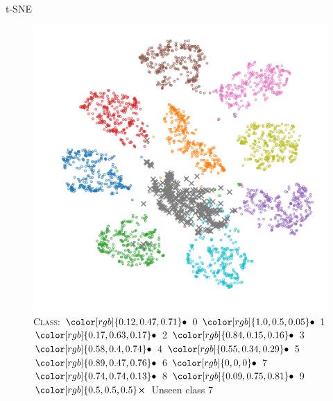 \documentclass[xcolor={usenames,dvipsnames}]{beamer}
\newcommand{\legendBulletMNIST}{\footnotesize
		\centering
		\textsc{Class}:
		${\color[rgb]{0.12, 0.47, 0.71}\bullet}$ 0
		${\color[rgb]{1.0, 0.5, 0.05}\bullet}$ 1
		${\color[rgb]{0.17, 0.63, 0.17}\bullet}$ 2
		${\color[rgb]{0.84, 0.15, 0.16}\bullet}$ 3
		${\color[rgb]{0.58, 0.4, 0.74}\bullet}$ 4
		${\color[rgb]{0.55, 0.34, 0.29}\bullet}$ 5
		${\color[rgb]{0.89, 0.47, 0.76}\bullet}$ 6
		${\color[rgb]{0, 0, 0}\bullet}$ 7
		${\color[rgb]{0.74, 0.74, 0.13}\bullet}$ 8
		${\color[rgb]{0.09, 0.75, 0.81}\bullet}$ 9\\
		${\color[rgb]{0.5, 0.5, 0.5}\boldsymbol{\times}}$ Unseen class
}
\begin{document}
\begin{frame}{\gls{t-SNE}}
\begin{figure}[H]
	\centering
	\includegraphics[width=.5\textwidth]{MNIST_t-SNE_wo_cl_7_after}
	\\[.2cm]
	\legendBulletMNIST 7
\end{figure}
\end{frame}
\end{document}
